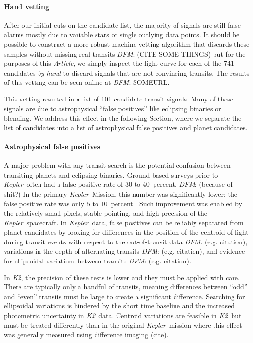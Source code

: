 \documentclass[12pt,preprint]{aastex}
\newcommand{\project}[1]{\textsl{#1}} %
\newcommand{\kepler}{\project{Kepler}}
\newcommand{\KT}{\project{K2}}
\newcommand{\paper}{\textsl{Article}}
\newcommand{\sectionname}{Section}
\newcommand{\todo}[3]{{\color{#2}\emph{#1}: #3}}
\newcommand{\dfmtodo}[1]{\todo{DFM}{red}{#1}}
\begin{document}
\paragraph{Hand vetting}

After our initial cuts on the candidate list, the majority of signals are
still false alarms mostly due to variable stars or single outlying data
points.
It should be possible to construct a more robust machine vetting algorithm
that discards these samples without missing real transits \dfmtodo{(CITE SOME THINGS)}
but for the purposes of this \paper, we simply inspect the light curve for
each of the 741 candidates \emph{by hand} to discard signals that are not
convincing transits.
The results of this vetting can be seen online at \dfmtodo{SOMEURL}.

This vetting resulted in a list of 101 candidate transit signals.
Many of these signals are due to astrophysical ``false positives'' like
eclipsing binaries or blending.
We address this effect in the following \sectionname, where we separate the list of
candidates into a list of astrophysical false positives and planet candidates.


\paragraph{Astrophysical false positives}

A major problem with any transit search is the potential confusion between
transiting planets and eclipsing binaries.
Ground-based surveys prior to \kepler\ often had a false-positive rate
of 30 to 40~percent. \dfmtodo{(because of shit?)}
In the primary \kepler\ Mission, this number was significantly lower:
the false positive rate was only 5 to 10~percent \citep{Morton:2011}.
Such improvement was enabled by the relatively small pixels, stable
pointing, and high precision of the \kepler\ spacecraft.
In \kepler\ data, false positives can be reliably separated from
planet candidates by looking for differences in the position of the
centroid of light during transit events with respect to the
out-of-transit data \dfmtodo{(e.g. citation)}, variations in the depth of
alternating transits \dfmtodo{(e.g. citation)}, and evidence for ellipsoidal
variations between transits \dfmtodo{(e.g. citation)}.

In \KT, the precision of these tests is lower and they must be applied with
care.
There are typically only a handful of transits, meaning differences between
``odd'' and ``even'' transits must be large to create a significant
difference.
Searching for ellipsoidal variations is hindered by the short time baseline
and the increased photometric uncertainty in \KT\ data.
Centroid variations are feasible in \KT\ but must be treated differently than
in the original \kepler\ mission where this effect was generally measured
using difference imaging (cite).
\end{document}
